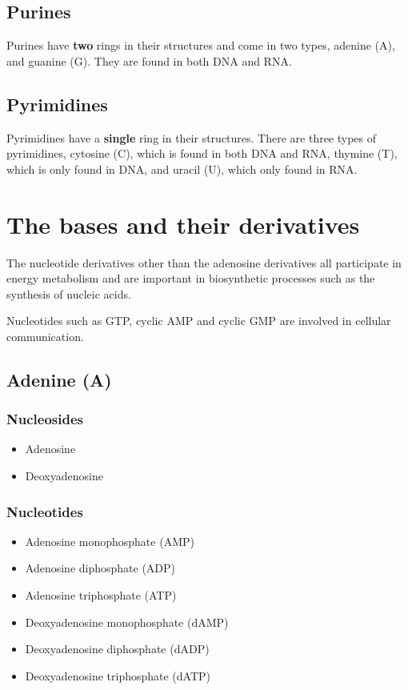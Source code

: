 \documentclass[11pt]{article}
\begin{document}
\subsection{Purines}
\label{sec:org3204900}
Purines have \textbf{two} rings in their structures and come in two types, adenine (A), and guanine (G). They are found in both DNA and RNA.
\subsection{Pyrimidines}
\label{sec:org844e794}
Pyrimidines have a \textbf{single} ring in their structures. There are three types of pyrimidines, cytosine (C), which is found in both DNA and RNA, thymine (T), which is only found in DNA, and uracil (U), which only found in RNA.

\newpage
\section{The bases and their derivatives}
\label{sec:orgcd132a6}
The nucleotide derivatives other than the adenosine derivatives all participate in energy metabolism and are important in biosynthetic processes such as the synthesis of nucleic acids.


Nucleotides such as GTP, cyclic AMP and cyclic GMP are involved in cellular communication.
\subsection{Adenine (A)}
\label{sec:org27a38cc}

\subsubsection{Nucleosides}
\label{sec:org0a5d500}
\begin{itemize}
\item Adenosine
\item Deoxyadenosine
\end{itemize}
\subsubsection{Nucleotides}
\label{sec:org42163e6}
\begin{itemize}
\item Adenosine monophosphate (AMP)
\item Adenosine diphosphate (ADP)
\item Adenosine triphosphate (ATP)
\item Deoxyadenosine monophosphate (dAMP)
\item Deoxyadenosine diphosphate (dADP)
\item Deoxyadenosine triphosphate (dATP)
\end{itemize}
\end{document}

